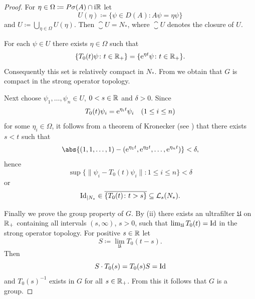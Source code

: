 \begin{proof}
For $\eta \in \Omega \coloneq P\sigma(A) \cap \mathrm{i}\mathbb{R}$ let
\[
U(\eta) \coloneq \{\psi \in D(A) \colon A\psi = \eta\psi\}
\]
and $U \coloneq \bigcup_{\eta \in \Omega} U(\eta)$. 
Then $\closure{U} = N_{*}$, where $\closure{U}$ denotes the closure of $U$.

For each $\psi \in U$ there exists $\eta \in \Omega$ such that
\[
\{T_{0}(t)\psi \colon t \in \mathbb{R}_{+}\} = \{\mathrm{e}^{\eta t}\psi \colon t \in \mathbb{R}_{+}\} .
\]
Consequently this set is relatively compact in $N_{*}$.
From \textcite[III.4.5]{schaefer:1966} we obtain that $G$ is compact in the strong operator topology.

Next choose $\psi_{1}, \dots, \psi_{n} \in U$, $0 < s \in \mathbb{R}$ and $\delta > 0$.
Since 
\[
T_{0}(t)\psi_{i} = \eu^{\eta_{i}t}\psi_{i} 
\quad (1 \leq i \leq n)
\]
for some $\eta_{i} \in \Omega$, it follows from a theorem of Kronecker (see \textcite[Satz 6.1, p.~77]{jacobs:1972}) that there exists $s < t$ such that
\[
\abs{(1,1, \dots, 1) - (\eu^{\eta_{1}t}, \eu^{\eta_{2}t}, \dots, \eu^{\eta_{n}t})} < \delta ,
\]
hence
\[
\sup\{\|\psi_{i} - T_{0}(t)\psi_{i}\| \colon 1 \leq i \leq n\} < \delta
\]
or 
\[
\operatorname{Id}_{|N_{*}} \in \overline{\{T_{0}(t) \colon t>s\}} \subseteq \mathcal{L}_{s}(N_{*}).
\]

Finally we prove the group property of\/ $G$.
By (ii) there exists an ultrafilter $\mathfrak{U}$ on $\mathbb{R}_{+}$ containing all intervals $(s,\infty)$, $s > 0$, such that $\lim_{\mathfrak{U}}T_{0}(t) = \operatorname{Id}$ in the strong operator topology.
For positive $s \in \mathbb{R}$ let 
%
\[
	S \coloneq \lim_{\mathfrak{U}}T_{0}(t-s) .
\]
%
Then 
%
\[
	S \cdot T_{0}(s) = T_{0}(s)S = \operatorname{Id}
\]
%
and $T_{0}(s)^{-1}$ exists in $G$ for all $s \in \mathbb{R}_{+}$.
From this it follows that $G$ is a group.
\end{proof}
